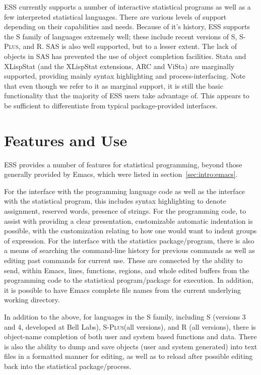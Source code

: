 \documentclass{article}
\newcommand*{\Splus}{\textsc{S-Plus}}
\begin{document}
ESS currently supports a number of interactive statistical programs as
well as a few interpreted statistical languages.  There are various
levels of support depending on their capabilities and needs.  Because
of it's history, ESS supports the S family of languages extremely
well; these include recent versions of S, \Splus, and R.  SAS is also
well supported, but to a lesser extent.  The lack of objects in SAS
has prevented the use of object completion facilities.  Stata and
XLispStat (and the XLispStat extensions, ARC and ViSta) are marginally
supported, providing mainly syntax highlighting and
process-interfacing.  Note that even though we refer to it as marginal
support, it is still the basic functionality that the majority of ESS
users take advantage of.  This appears to be sufficient to
differentiate from typical package-provided interfaces.

\section{Features and Use}
\label{sec:basic}


ESS provides a number of features for statistical programming, beyond
those generally provided by Emacs, which were listed in
section~\ref{sec:intro:emacs}.

For the interface with the programming language code as well as the
interface with the statistical program, this includes syntax
highlighting to denote assignment, reserved words, presence of
strings.  For the programming code, to assist with providing a clear
presentation, customizable automatic indentation is possible, with the
customization relating to how one would want to indent groups of
expression.  For the interface with the statistics package/program,
there is also a means of searching the command-line history for
previous commands as well as editing past commands for current use.
These are connected by the ability to send, within Emacs, lines,
functions, regions, and whole edited buffers from the programming code
to the statistical program/package for execution.  In addition, it is
possible to have Emacs complete file names from the current underlying
working directory.

In addition to the above, for languages in the S family, including S
(versions 3 and 4, developed at Bell Labs), \Splus (all versions), and
R (all versions), there is object-name completion of both user and
system based functions and data.  There is also the ability to dump
and save objects (user and system generated) into text files in a
formatted manner for editing, as well as to reload after possible
editing back into the statistical package/process.
\end{document}
